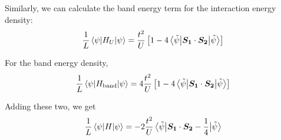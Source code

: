 \documentclass[]{report}
\renewcommand{\vec}{\bm}
\begin{document}
Similarly, we can calculate the band energy term for the interaction energy density:
\begin{align}
\frac{1}{L}\expval{H_U}{\psi} = \frac{t^2}{U} \left[1 - 4 \expval{\vec{S_{1}}\cdot\vec{S_{2}}}{\tilde{\psi}} \right]
\end{align}

For the band energy density,
\begin{align}
\frac{1}{L}\expval{H_\mathrm{band}}{\psi} = 4\frac{t^2}{U} \left[1 - 4 \expval{\vec{S_{1}}\cdot\vec{S_{2}}}{\tilde{\psi}} \right]
\end{align}

Adding these two, we get
\begin{align}
\frac{1}{L}\expval{H}{\psi} = -2\frac{t^2}{U}  \expval{\vec{S_{1}}\cdot\vec{S_{2}} - \frac{1}{4}}{\tilde{\psi}}
\end{align}
\end{document}
